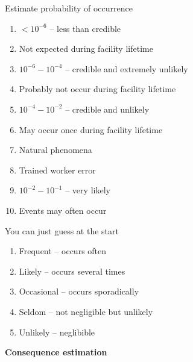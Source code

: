 \documentclass[aspectratio=1610,pdftex,dvipsnames,compress,xcolor={dvipsnames}]{beamer}
\begin{document}
\addtocounter{framenumber}{-2}
\begin{frame}{Estimate probability of occurrence}
    \begin{enumerate}[series=outerlist,topsep=0pt,itemsep=3pt,leftmargin=*,label=(\arabic*)]
        \item[]$< 10^{-6}$ -- less than credible 
        \item[]Not expected during facility lifetime
            \vspace{0.10in}
        \item[]$10^{-6} - 10^{-4}$ -- credible and extremely unlikely
        \item[]Probably not occur during facility lifetime
            \vspace{0.10in}
        \item[]$10^{-4} - 10^{-2}$ -- credible and unlikely
        \item[]May occur once during facility lifetime
        \item[]Natural phenomena
        \item[]Trained worker error
            \vspace{0.10in}
        \item[]$10^{-2} - 10^{-1}$ -- very likely
        \item[]Events may often occur
    \end{enumerate}
\end{frame}


\begin{frame}{You can just guess at the start}
    \begin{enumerate}[series=outerlist,topsep=0pt,itemsep=21pt,leftmargin=*,label=(\arabic*)]
        \item[]Frequent -- occurs often
        \item[]Likely -- occurs several times
        \item[]Occasional -- occurs sporadically
        \item[]Seldom -- not negligible but unlikely
        \item[]Unlikely -- neglibible
    \end{enumerate}
\end{frame}


\begin{frame}[plain]{}
    \centering\LARGE\textbf{Consequence estimation}
\end{frame}
\end{document}
